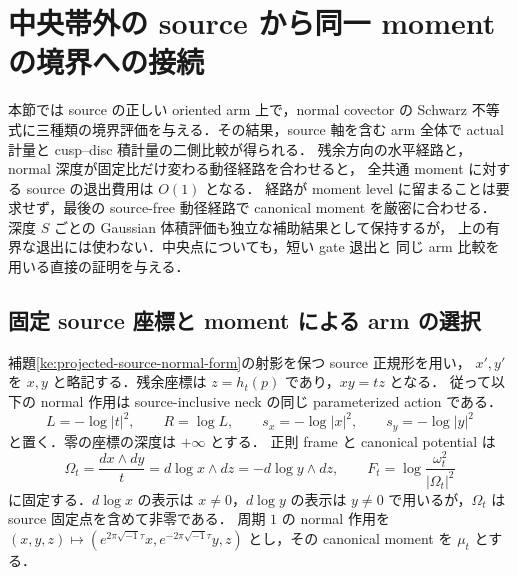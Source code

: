 \section{中央帯外の source から同一 moment の境界への接続}
\label{ke:source-all-moment-connectors-section}

本節では source の正しい oriented arm 上で，normal covector の
Schwarz 不等式に三種類の境界評価を与える．その結果，source 軸を含む
arm 全体で actual 計量と cusp--disc 積計量の二側比較が得られる．
残余方向の水平経路と，normal 深度が固定比だけ変わる動径経路を合わせると，
全共通 moment に対する source の退出費用は $O(1)$ となる．
経路が moment level に留まることは要求せず，最後の source-free 動径経路で
canonical moment を厳密に合わせる．
深度 $S$ ごとの Gaussian 体積評価も独立な補助結果として保持するが，
上の有界な退出には使わない．中央点についても，短い gate 退出と
同じ arm 比較を用いる直接の証明を与える．

\subsection{固定 source 座標と moment による arm の選択}

補題\ref{ke:projected-source-normal-form}の射影を保つ source 正規形を用い，
$x',y'$ を $x,y$ と略記する．残余座標は $z=h_t(p)$ であり，$xy=tz$ となる．
従って以下の normal 作用は source-inclusive neck の同じ parameterized action
である．
\[
 L=-\log|t|^2,\qquad R=\log L,\qquad
 s_x=-\log|x|^2,\qquad s_y=-\log|y|^2
\]
と置く．零の座標の深度は $+\infty$ とする．
正則 frame と canonical potential は
\[
 \Omega_t=\frac{dx\wedge dy}{t}
          =d\log x\wedge dz=-d\log y\wedge dz,
 \qquad F_t=\log\frac{\omega_t^2}{|\Omega_t|^2}
\]
に固定する．$d\log x$ の表示は $x\ne0$，$d\log y$ の表示は $y\ne0$
で用いるが，$\Omega_t$ は source 固定点を含めて非零である．
周期 $1$ の normal 作用を
$(x,y,z)\mapsto(e^{2\pi\sqrt{-1}\tau}x,e^{-2\pi\sqrt{-1}\tau}y,z)$
とし，その canonical moment を $\mu_t$ とする．


